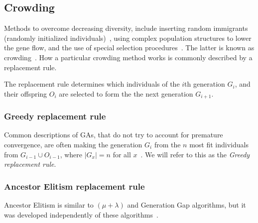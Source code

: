 \subsection{Crowding}
Methods to overcome decreasing diversity, include inserting random immigrants (randomly initialized individuals)~\cite{Cobb93geneticalgorithms}, using complex population structures to lower the gene flow, and the use of special selection procedures~\cite{ursem2002diversity}. The latter is known as crowding~\cite{DeJong:1975:ABC:907087}. How a particular crowding method works is commonly described by a replacement rule.

The replacement rule determines which individuals of the $i$th generation $G_i$,
and their offspring $O_i$ are selected to form the the next generation $G_{i+1}$.

\subsubsection{Greedy replacement rule}
Common descriptions of GAs, that do not try to account for premature convergence,
are often making the generation $G_i$ from the $n$ most fit individuals from $G_{i-1} \cup O_{i-1}$, where $\lvert G_x \rvert = n$ for all $x$~\cite{masterThesisGANN}.
We will refer to this as the \emph{Greedy replacement rule}.

%
%

\subsubsection{Ancestor Elitism replacement rule}
Ancestor Elitism is similar to $(\mu + \lambda)$ and Generation Gap algorithms, but it was developed independently of these algorithms~\cite[p. 34, p. 50]{Luke2013Metaheuristics}.

